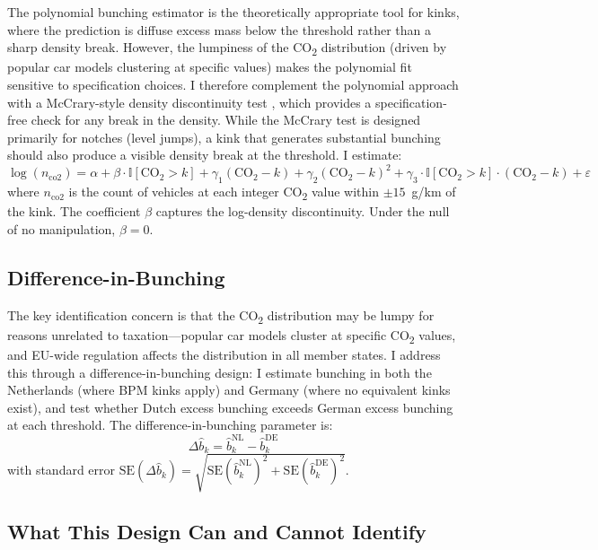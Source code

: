\documentclass[12pt]{article}
\newcommand{\ind}{\mathbb{I}}
\begin{document}
The polynomial bunching estimator is the theoretically appropriate tool for kinks, where the prediction is diffuse excess mass below the threshold rather than a sharp density break. However, the lumpiness of the CO\textsubscript{2} distribution (driven by popular car models clustering at specific values) makes the polynomial fit sensitive to specification choices. I therefore complement the polynomial approach with a McCrary-style density discontinuity test \citep{mccrary2008}, which provides a specification-free check for any break in the density. While the McCrary test is designed primarily for notches (level jumps), a kink that generates substantial bunching should also produce a visible density break at the threshold. I estimate:
\begin{equation}
\log(n_{\text{co2}}) = \alpha + \beta \cdot \ind[\text{CO}_2 > k] + \gamma_1 ({\text{CO}_2 - k}) + \gamma_2 ({\text{CO}_2 - k})^2 + \gamma_3 \cdot \ind[\text{CO}_2 > k] \cdot ({\text{CO}_2 - k}) + \varepsilon
\end{equation}
where $n_{\text{co2}}$ is the count of vehicles at each integer CO\textsubscript{2} value within $\pm 15$~g/km of the kink. The coefficient $\beta$ captures the log-density discontinuity. Under the null of no manipulation, $\beta = 0$.

\subsection{Difference-in-Bunching}

The key identification concern is that the CO\textsubscript{2} distribution may be lumpy for reasons unrelated to taxation---popular car models cluster at specific CO\textsubscript{2} values, and EU-wide regulation affects the distribution in all member states. I address this through a difference-in-bunching design: I estimate bunching in both the Netherlands (where BPM kinks apply) and Germany (where no equivalent kinks exist), and test whether Dutch excess bunching exceeds German excess bunching at each threshold. The difference-in-bunching parameter is:
\begin{equation}
\Delta \hat{b}_k = \hat{b}^{\text{NL}}_k - \hat{b}^{\text{DE}}_k
\end{equation}
with standard error $\text{SE}(\Delta \hat{b}_k) = \sqrt{\text{SE}(\hat{b}^{\text{NL}}_k)^2 + \text{SE}(\hat{b}^{\text{DE}}_k)^2}$.

\subsection{What This Design Can and Cannot Identify}
\end{document}
